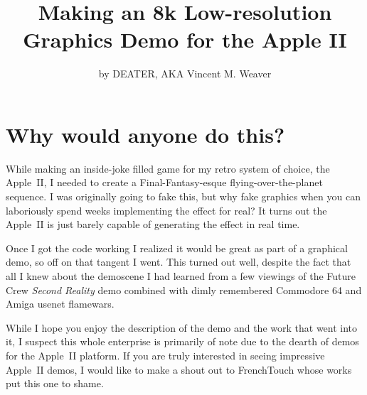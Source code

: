\documentclass[twocolumn]{article}
\begin{document}
\title{Making an 8k Low-resolution Graphics Demo for the Apple II}
\author{by DEATER, AKA Vincent M. Weaver}
\date{}
\maketitle

\thispagestyle{firststyle}

\section{Why would anyone do this?}

While making an inside-joke filled game for my retro system of choice,
the Apple~II, I needed to create a Final-Fantasy-esque
flying-over-the-planet sequence.
I was originally going to fake this, but why fake graphics when you
can laboriously spend weeks implementing the effect for real?
It turns out the Apple~II is just barely capable of generating
the effect in real time.

Once I got the code working I realized it would be great as part of a
graphical demo, so off on that tangent I went.
This turned out well, despite the fact that all I knew about the demoscene I
had learned from a few viewings of the Future Crew {\em Second Reality} demo
combined with dimly remembered Commodore 64 and Amiga usenet flamewars.



While I hope you enjoy the description of the demo and the work that
went into it, I suspect this whole enterprise is primarily of note
due to the dearth of demos for the Apple~II platform.
If you are truly interested in seeing impressive Apple~II demos, 
I would like to make a shout out to FrenchTouch whose works
put this one to shame.

\end{document}
